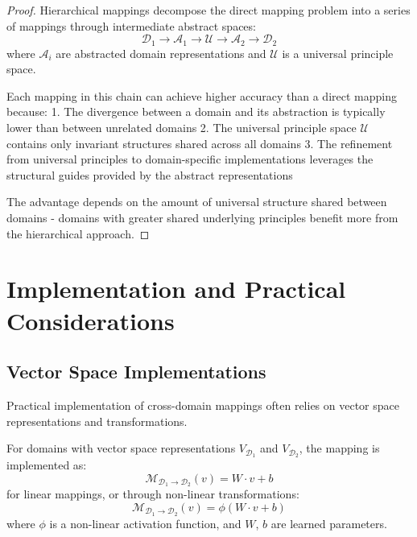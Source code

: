 \begin{proof}
Hierarchical mappings decompose the direct mapping problem into a series of mappings through intermediate abstract spaces:
\begin{equation}
\mathcal{D}_1 \rightarrow \mathcal{A}_1 \rightarrow \mathcal{U} \rightarrow \mathcal{A}_2 \rightarrow \mathcal{D}_2
\end{equation}
where $\mathcal{A}_i$ are abstracted domain representations and $\mathcal{U}$ is a universal principle space.

Each mapping in this chain can achieve higher accuracy than a direct mapping because:
1. The divergence between a domain and its abstraction is typically lower than between unrelated domains
2. The universal principle space $\mathcal{U}$ contains only invariant structures shared across all domains
3. The refinement from universal principles to domain-specific implementations leverages the structural guides provided by the abstract representations

The advantage depends on the amount of universal structure shared between domains - domains with greater shared underlying principles benefit more from the hierarchical approach.
\end{proof}

\section{Implementation and Practical Considerations}

\subsection{Vector Space Implementations}

Practical implementation of cross-domain mappings often relies on vector space representations and transformations.

\begin{definition}
For domains with vector space representations $V_{\mathcal{D}_1}$ and $V_{\mathcal{D}_2}$, the mapping is implemented as:
\begin{equation}
\mathcal{M}_{\mathcal{D}_1 \rightarrow \mathcal{D}_2}(v) = W \cdot v + b
\end{equation}
for linear mappings, or through non-linear transformations:
\begin{equation}
\mathcal{M}_{\mathcal{D}_1 \rightarrow \mathcal{D}_2}(v) = \phi(W \cdot v + b)
\end{equation}
where $\phi$ is a non-linear activation function, and $W$, $b$ are learned parameters.
\end{definition}

